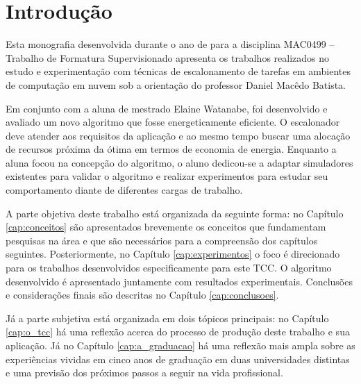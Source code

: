 \chapter{Introdução}
\label{cap:introducao}
Esta monografia desenvolvida durante o ano de  para a disciplina MAC0499 --
Trabalho de Formatura Supervisionado apresenta os trabalhos realizados no estudo
e experimentação com técnicas de escalonamento de tarefas em ambientes de 
computação em nuvem sob a orientação do professor Daniel Macêdo Batista.

Em conjunto com a aluna de mestrado Elaine Watanabe, foi desenvolvido e avaliado
um novo algoritmo que fosse energeticamente eficiente. O escalonador deve
atender aos requisitos da aplicação e ao mesmo tempo buscar uma alocação
de recursos próxima da ótima em termos de economia de energia.
Enquanto a aluna focou na concepção do algoritmo, o aluno dedicou-se a adaptar
simuladores existentes para validar o algoritmo e realizar experimentos para 
estudar seu comportamento diante de diferentes cargas de trabalho.

A parte objetiva deste trabalho está organizada da seguinte forma: no Capítulo
\ref{cap:conceitos} são apresentados brevemente os conceitos que fundamentam
pesquisas na área e que são necessários para a compreensão dos capítulos
seguintes. Posteriormente, no Capítulo \ref{cap:experimentos} o foco é
direcionado para os trabalhos desenvolvidos especificamente para este TCC. 
O algoritmo desenvolvido é apresentado juntamente com resultados experimentais.
Conclusões e considerações finais são descritas no Capítulo
\ref{cap:conclusoes}.

Já a parte subjetiva está organizada em dois tópicos principais: no Capítulo 
\ref{cap:o_tcc} há uma reflexão acerca do processo de produção deste trabalho
e sua aplicação. Já no Capítulo \ref{cap:a_graduacao} há uma reflexão mais ampla
sobre as experiências vividas em cinco anos de graduação em duas universidades
distintas e uma previsão dos próximos passos a seguir na vida profissional.



